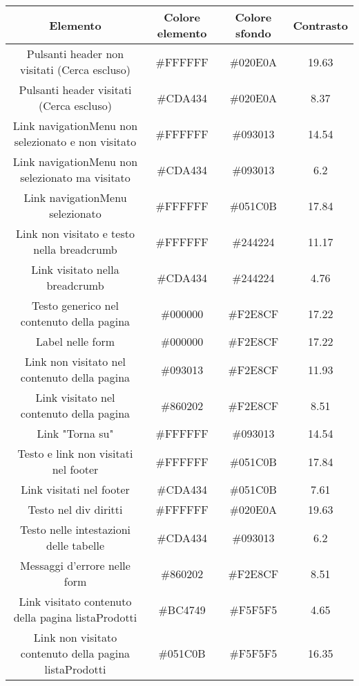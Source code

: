 \begin{longtable}{|c|c|c|c|}
\hline
\textbf{Elemento} & \textbf{Colore elemento} & \textbf{Colore sfondo} & \textbf{Contrasto}  \\ \hline

    Pulsanti header non visitati (Cerca escluso) & \#FFFFFF & \#020E0A & 19.63  \\ \hline
    Pulsanti header visitati (Cerca escluso) & \#CDA434 & \#020E0A & 8.37  \\ \hline
    Link navigationMenu non selezionato e non visitato & \#FFFFFF & \#093013 & 14.54  \\ \hline
    Link navigationMenu non selezionato ma visitato & \#CDA434 & \#093013 & 6.2  \\ \hline
    Link navigationMenu selezionato & \#FFFFFF & \#051C0B & 17.84  \\ \hline
    Link non visitato e testo nella breadcrumb & \#FFFFFF & \#244224 & 11.17  \\ \hline
    Link visitato nella breadcrumb & \#CDA434 & \#244224 & 4.76  \\ \hline
    Testo generico nel contenuto della pagina & \#000000 & \#F2E8CF  & 17.22 \\ \hline
    Label nelle form & \#000000 & \#F2E8CF  & 17.22 \\ \hline
    Link non visitato nel contenuto della pagina & \#093013 & \#F2E8CF  & 11.93 \\ \hline
    Link visitato nel contenuto della pagina & \#860202 & \#F2E8CF  & 8.51 \\ \hline
    Link "Torna su" & \#FFFFFF & \#093013 & 14.54  \\ \hline
    Testo e link non visitati nel footer & \#FFFFFF & \#051C0B & 17.84 \\ \hline
    Link visitati nel footer & \#CDA434 & \#051C0B & 7.61 \\ \hline
    Testo nel div diritti & \#FFFFFF & \#020E0A & 19.63 \\ \hline
    Testo nelle intestazioni delle tabelle & \#CDA434 & \#093013 & 6.2  \\ \hline
    Messaggi d'errore nelle form & \#860202 & \#F2E8CF  & 8.51 \\ \hline
    Link visitato contenuto della pagina listaProdotti & \#BC4749 & \#F5F5F5 & 4.65 \\ \hline
    Link non visitato contenuto della pagina listaProdotti & \#051C0B & \#F5F5F5 & 16.35 \\ \hline
\end{longtable}

